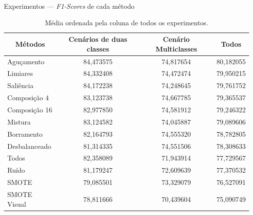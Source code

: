 \documentclass[10pt]{beamer}
\begin{document}
\begin{frame}{Experimentos --- \textit{F1-Scores} de cada método}
  \setlength\leftmargini{1em}
  \begin{table}
    \centering
    \caption{Média ordenada pela coluna de todos os experimentos.}
    \footnotesize{
    \begin{tabular}{|l|c|c|c|}
      \hline
      \multicolumn{1}{|c|}{\textbf{Métodos}} & \textbf{Cenários de duas classes} & \textbf{Cenário Multiclasses} & \textbf{Todos} \\ \hline
      Aguçamento                             & 84,473575                         & 74,817654                     & 80,182055      \\ \hline
      Limiares                               & 84,332408                         & 74,472474                     & 79,950215      \\ \hline
      Saliência                              & 84,172238                         & 74,248645                     & 79,761752      \\ \hline
      Composição 4                           & 83,123738                         & 74,667785                     & 79,365537      \\ \hline
      Composição 16                          & 82,977850                         & 74,581912                     & 79,246322      \\ \hline
      Mistura                                & 83,124582                         & 74,045887                     & 79,089606      \\ \hline
      Borramento                             & 82,164793                         & 74,555320                     & 78,782805      \\ \hline
      Desbalanceado                          & 81,314335                         & 74,551506                     & 78,308633      \\ \hline
      Todos                                  & 82,358089                         & 71,943914                     & 77,729567      \\ \hline
      Ruído                                  & 81,179247                         & 72,609639                     & 77,370532      \\ \hline
      SMOTE                                  & 79,085501                         & 73,329079                     & 76,527091      \\ \hline
      SMOTE Visual                           & 78,811666                         & 70,439604                     & 75,090749      \\ \hline
    \end{tabular}
    }
  \end{table}
\end{frame}
\end{document}
